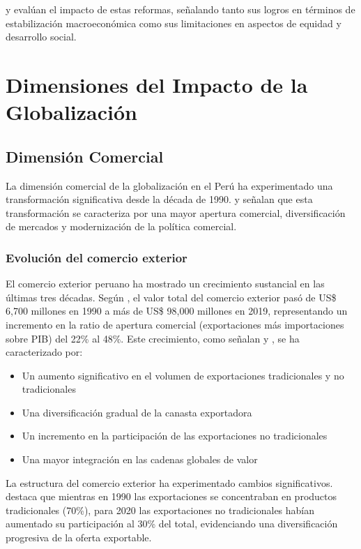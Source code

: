 \documentclass[12pt, a4paper]{article}
\begin{document}
\cite{franco2018} y \cite{vega2019} evalúan el impacto de estas reformas, señalando tanto sus logros en términos de estabilización macroeconómica como sus limitaciones en aspectos de equidad y desarrollo social.

\section{Dimensiones del Impacto de la Globalización}

\subsection{Dimensión Comercial}

La dimensión comercial de la globalización en el Perú ha experimentado una transformación significativa desde la década de 1990. \cite{santa_cruz2021} y \cite{rodriguez2019} señalan que esta transformación se caracteriza por una mayor apertura comercial, diversificación de mercados y modernización de la política comercial.

\subsubsection{Evolución del comercio exterior}
El comercio exterior peruano ha mostrado un crecimiento sustancial en las últimas tres décadas. Según \cite{tello2018}, el valor total del comercio exterior pasó de US\$ 6,700 millones en 1990 a más de US\$ 98,000 millones en 2019, representando un incremento en la ratio de apertura comercial (exportaciones más importaciones sobre PIB) del 22\% al 48\%. Este crecimiento, como señalan \cite{mendoza2017} y \cite{torres2020}, se ha caracterizado por:

\begin{itemize}
    \item Un aumento significativo en el volumen de exportaciones tradicionales y no tradicionales
    \item Una diversificación gradual de la canasta exportadora
    \item Un incremento en la participación de las exportaciones no tradicionales
    \item Una mayor integración en las cadenas globales de valor
\end{itemize}

La estructura del comercio exterior ha experimentado cambios significativos. \cite{leon2019} destaca que mientras en 1990 las exportaciones se concentraban en productos tradicionales (70\%), para 2020 las exportaciones no tradicionales habían aumentado su participación al 30\% del total, evidenciando una diversificación progresiva de la oferta exportable.
\end{document}
